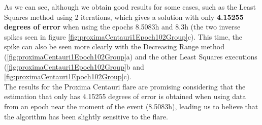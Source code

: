 As we can see, although we obtain good results for some cases, such as the Least Squares method using 2 iterations, which gives a solution with only \textbf{4.15255 degrees of error} when using the epochs 8.5083h and 8.3h (the two inverse spikes seen in figure \ref{fig:proximaCentauri1Epoch102Group}c). This time, the spike can also be seen more clearly with the Decreasing Range method (\ref{fig:proximaCentauri1Epoch102Group}a) and the other Least Squares executions (\ref{fig:proximaCentauri1Epoch102Group}b and \ref{fig:proximaCentauri1Epoch102Group}c). \\

The results for the Proxima Centauri flare are promising considering that the estimation that only has 4.15255 degrees of error is obtained when using data from an epoch near the moment of the event (8.5083h), leading us to believe that the algorithm has been slightly sensitive to the flare.






